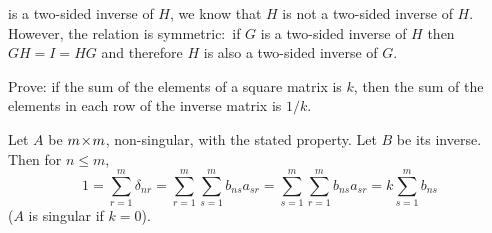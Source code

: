 \begin{exercises}
\begin{answer}
     is a two-sided inverse of \( H \), we know that \( H \) is not a two-sided
     inverse of \( H \).
     However, the relation is symmetric:~if \( G \) is a two-sided inverse of 
     \( H \) then
     \( GH=I=HG \) and therefore \( H \) is also a two-sided
     inverse of \( G \).  
   \end{answer}
  \item  
    \cite{Monthly51p614}
    Prove: if the sum of the elements of a square
    matrix is \( k \), then the sum of the elements in each row of the
    inverse matrix is \( 1/k \).
    \begin{answer}
      \answerasgiven %
      Let \( A \) be \( m \! \times \! m \), non-singular, with the stated property.
      Let \( B \) be its inverse.
      Then for \( n\leq m \),
      \begin{equation*}
        1
        =\sum_{r=1}^{m}\delta_{nr}
        =\sum_{r=1}^{m}\sum_{s=1}^{m}b_{ns}a_{sr}
        =\sum_{s=1}^{m}\sum_{r=1}^{m}b_{ns}a_{sr}
        =k\sum_{s=1}^{m}b_{ns}
      \end{equation*}
      (\( A \) is singular if \( k=0 \)).  
   \end{answer}
\end{exercises}







